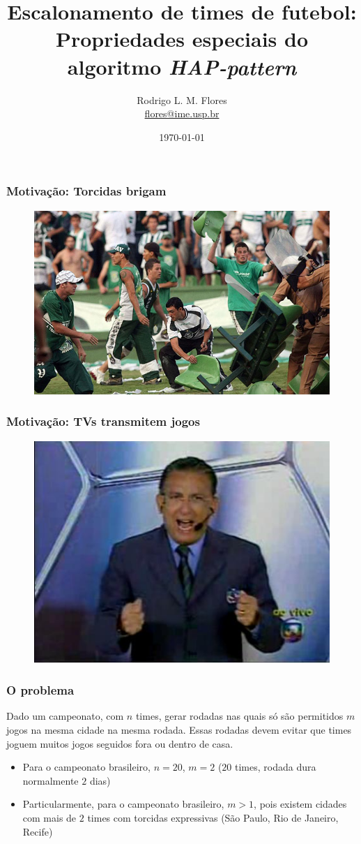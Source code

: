 \documentclass{beamer}
\title{Escalonamento de times de futebol: Propriedades especiais do algoritmo \textit{HAP-pattern}}
\author{Rodrigo L. M. Flores \\ \url{flores@ime.usp.br}}
\institute{Instituto de Matemática e Estatística\\Universidade de São Paulo}
\begin{document}
\date{\today}

\frame{\titlepage}

\begin{frame}
  \frametitle{Motivação: Torcidas brigam}
  \begin{figure}
    \includegraphics[scale=0.3]{torcida.jpg}
  \end{figure}
\end{frame}


\begin{frame}
  \frametitle{Motivação: TVs transmitem jogos}
  \begin{figure}
    \includegraphics[scale=0.5]{galvao.jpg}
  \end{figure}
\end{frame}

\begin{frame}
  \frametitle{O problema}
  Dado um campeonato, com $n$ times, gerar rodadas nas quais só são permitidos $m$ jogos 
  na mesma cidade na mesma rodada. Essas rodadas devem evitar que times joguem muitos jogos
  seguidos fora ou dentro de casa.

  \begin{itemize}
    \item Para o campeonato brasileiro, $n = 20$, $m = 2$ ($20$ times, rodada dura normalmente $2$ dias)
    \item Particularmente, para o campeonato brasileiro, $m > 1$, pois existem cidades com mais de $2$ times com torcidas expressivas 
  (São Paulo, Rio de Janeiro, Recife)
  \end{itemize}
\end{frame}
\end{document}
